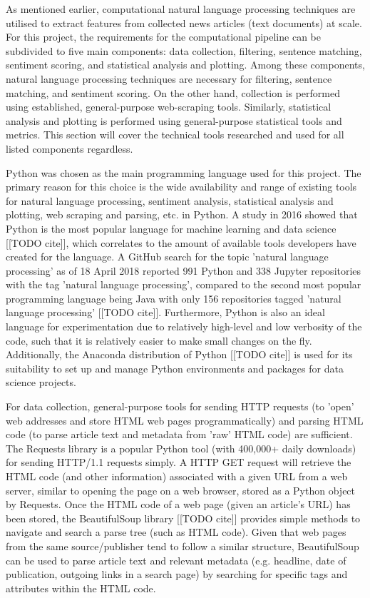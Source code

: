\documentclass{report}
\begin{document}
As mentioned earlier, computational natural language processing techniques are utilised to extract features from collected news articles (text documents) at scale.
For this project, the requirements for the computational pipeline can be subdivided to five main components: data collection, filtering, sentence matching, sentiment scoring, and statistical analysis and plotting.
Among these components, natural language processing techniques are necessary for filtering, sentence matching, and sentiment scoring.
On the other hand, collection is performed using established, general-purpose web-scraping tools.
Similarly, statistical analysis and plotting is performed using general-purpose statistical tools and metrics.
This section will cover the technical tools researched and used for all listed components regardless.

Python was chosen as the main programming language used for this project.
The primary reason for this choice is the wide availability and range of existing tools for natural language processing, sentiment analysis, statistical analysis and plotting, web scraping and parsing, etc. in Python.
A study in 2016 showed that Python is the most popular language for machine learning and data science [[TODO cite]], which correlates to the amount of available tools developers have created for the language.
A GitHub search for the topic 'natural language processing' as of 18 April 2018 reported 991 Python and 338 Jupyter repositories with the tag 'natural language processing', compared to the second most popular programming language being Java with only 156 repositories tagged 'natural language processing' [[TODO cite]].
Furthermore, Python is also an ideal language for experimentation due to relatively high-level and low verbosity of the code, such that it is relatively easier to make small changes on the fly.
Additionally, the Anaconda distribution of Python [[TODO cite]] is used for its suitability to set up and manage Python environments and packages for data science projects.

For data collection, general-purpose tools for sending HTTP requests (to 'open' web addresses and store HTML web pages programmatically) and parsing HTML code (to parse article text and metadata from 'raw' HTML code) are sufficient. 
The Requests library \cite{Requests} is a popular Python tool (with 400,000+ daily downloads) for sending HTTP/1.1 requests simply.
A HTTP GET request will retrieve the HTML code (and other information) associated with a given URL from a web server, similar to opening the page on a web browser, stored as a Python object by Requests.
Once the HTML code of a web page (given an article's URL) has been stored, the BeautifulSoup library [[TODO cite]] provides simple methods to navigate and search a parse tree (such as HTML code).
Given that web pages from the same source/publisher tend to follow a similar structure, BeautifulSoup can be used to parse article text and relevant metadata (e.g. headline, date of publication, outgoing links in a search page) by searching for specific tags and attributes within the HTML code.
\end{document}
